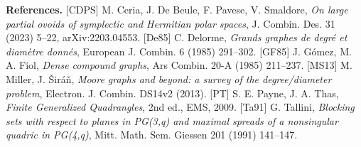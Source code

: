 \documentclass[
  11pt,
]{article}
\begin{document}
\textbf{References.} {[}CDPS{]} M. Ceria, J. De Beule, F. Pavese, V.
Smaldore, \emph{On large partial ovoids of symplectic and Hermitian
polar spaces}, J. Combin. Des. 31 (2023) 5--22, arXiv:2203.04553.
{[}De85{]} C. Delorme, \emph{Grands graphes de degré et diamètre
donnés}, European J. Combin. 6 (1985) 291--302. {[}GF85{]} J. Gómez, M.
A. Fiol, \emph{Dense compound graphs}, Ars Combin. 20-A (1985) 211--237.
{[}MS13{]} M. Miller, J. Širáň, \emph{Moore graphs and beyond: a survey
of the degree/diameter problem}, Electron. J. Combin. DS14v2 (2013).
{[}PT{]} S. E. Payne, J. A. Thas, \emph{Finite Generalized Quadrangles},
2nd ed., EMS, 2009. {[}Ta91{]} G. Tallini, \emph{Blocking sets with
respect to planes in PG(3,q) and maximal spreads of a nonsingular
quadric in PG(4,q)}, Mitt. Math. Sem. Giessen 201 (1991) 141--147.
\end{document}
